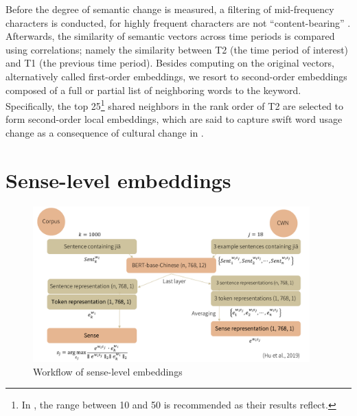 Before the degree of semantic change is measured, a filtering of mid-frequency characters is conducted, for highly frequent characters are not ``content-bearing'' \parencite{hamilton2016cultural,rodda2017panta}. Afterwards, the similarity of semantic vectors across time periods is compared using correlations; namely the similarity between T2 (the time period of interest) and T1 (the previous time period). Besides computing on the original vectors, alternatively called first-order embeddings, we resort to second-order embeddings composed of a full or partial list of neighboring words to the keyword. Specifically, the top 25\footnote{In \textcite{hamilton2016cultural}, the range between 10 and 50 is recommended as their results reflect.} shared neighbors in the rank order of T2 are selected to form second-order local embeddings, which are said to capture swift word usage change as a consequence of cultural change in \textcite{hamilton2016cultural}.

\section{Sense-level embeddings}

\begin{figure}[H]
  \centering
  \includegraphics[height=0.4\textheight,width=0.95\textwidth,keepaspectratio]{figures_new/workflow_sense_level.pdf}
  \caption{Workflow of sense-level embeddings}
  \label{fig:workflow_sense_level}
\end{figure}

